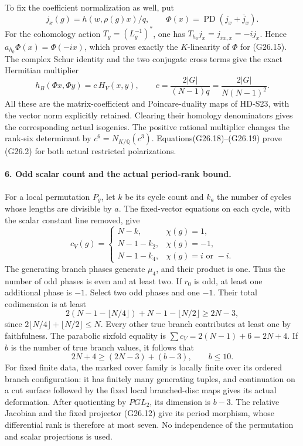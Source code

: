 To fix the coefficient normalization as well, put
\[
 j_x(g)=h(w,\rho(g)x)/q,\qquad
                      \Phi(x)=\operatorname{PD}(j_x+\bar j_x).
 \]
For the cohomology action \(T_g=(L_g^{-1})^*\), one has
\(T_{h_0}j_x=j_{iw,x}=-ij_x\). Hence
\(a_{h_0}\Phi(x)=\Phi(-ix)\), which proves exactly the
\(K\)-linearity of \(\Phi\) for (G26.15).
The complex Schur identity and the two conjugate cross terms
give the exact Hermitian multiplier
\[
 h_B(\Phi x,\Phi y)
          =c\,H_V(x,y),\qquad
 c=\frac{2|G|}{(N-1)q}
                    =\frac{2|G|}{N(N-1)^2}.               \tag{G26.19}
\]
All these are the matrix-coefficient and Poincare-duality
maps of HD-S23, with the vector norm explicitly retained.
Clearing their homology denominators gives the corresponding
actual isogenies. The positive rational multiplier changes
the rank-six determinant by \(c^6=N_{K/\mathbb Q}(c^3)\).
Equations(G26.18)--(G26.19) prove (G26.2) for both actual
restricted polarizations.

\paragraph{6. Odd scalar count and the actual period-rank bound.}
For a local permutation \(P_g\), let \(k\) be its cycle
count and \(k_a\) the number of cycles whose lengths are
divisible by \(a\). The fixed-vector equations on each
cycle, with the scalar constant line removed, give
\[
 c_V(g)=
 \begin{cases}
 N-k,&\chi(g)=1,\\
 N-1-k_2,&\chi(g)=-1,\\
 N-1-k_4,&\chi(g)=i\text{ or }-i.
 \end{cases}                                               \tag{G26.20}
\]
The generating branch phases generate \(\mu_4\), and their
product is one. Thus the number of odd phases is even and
at least two. If \(r_0\) is odd, at least one additional
phase is \(-1\). Select two odd phases and one \(-1\).
Their total codimension is at least
\[
 2(N-1-\lfloor N/4\rfloor)
       +N-1-\lfloor N/2\rfloor\ge2N-3,
 \]
since \(2\lfloor N/4\rfloor+\lfloor N/2\rfloor\le N\).
Every other true branch contributes at least one by faithfulness.
The parabolic sixfold equality is
\(\sum c_V=2(N-1)+6=2N+4\). If \(b\) is the number
of true branch values, it follows that
\[
                    2N+4\ge(2N-3)+(b-3),\qquad b\le10.
                                                               \tag{G26.21}
\]
For fixed finite data, the marked cover family is locally
finite over its ordered branch configuration: it has finitely
many generating tuples, and continuation on a cut surface
followed by the fixed local branched-disc maps gives its
actual deformation. After quotienting by \(PGL_2\), its
dimension is \(b-3\). The relative Jacobian and the fixed
projector (G26.12) give its period morphism, whose differential
rank is therefore at most seven. No independence of the
permutation and scalar projections is used.

